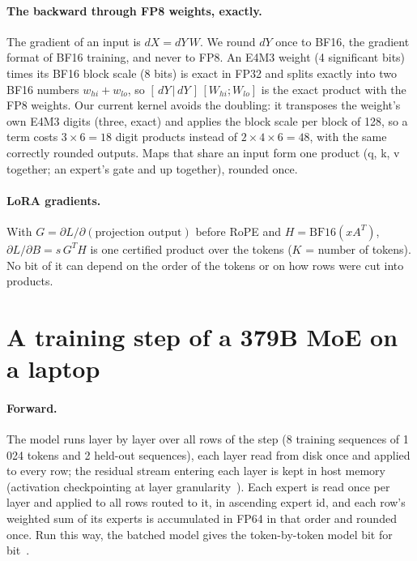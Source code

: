 \documentclass[11pt]{article}
\begin{document}
\paragraph{The backward through FP8 weights, exactly.} The gradient of an input is $dX = dY\,W$. We round $dY$ once to BF16,
the gradient format of BF16 training, and never to FP8. An E4M3 weight (4 significant bits) times its BF16 block scale
(8 bits) is exact in FP32 and splits exactly into two BF16 numbers $w_{hi}+w_{lo}$, so $[\,dY\,|\,dY\,]\,[W_{hi};W_{lo}]$ is the
exact product with the FP8 weights. Our current kernel avoids the doubling: it transposes the weight's own E4M3 digits (three,
exact) and applies the block scale per block of 128, so a term costs $3\times6=18$ digit products instead of
$2\times4\times6=48$, with the same correctly rounded outputs. Maps that share an input form one product (q, k, v together;
an expert's gate and up together), rounded once.

\paragraph{LoRA gradients.} With $G=\partial L/\partial(\text{projection output})$ before RoPE and $H=\text{BF16}(x A^{T})$,
$\partial L/\partial B = s\,G^{T} H$ is one certified product over the tokens ($K$ = number of tokens). No bit of it can depend
on the order of the tokens or on how rows were cut into products.

\section{A training step of a 379B MoE on a laptop}\label{sec:step}

\paragraph{Forward.} The model runs layer by layer over all rows of the step (8 training sequences of 1\,024 tokens and 2
held-out sequences), each layer read from disk once and applied to every row; the residual stream entering each layer is kept
in host memory (activation checkpointing at layer granularity~\cite{chen16}). Each expert is read once per layer and applied to
all rows routed to it, in ascending expert id, and each row's weighted sum of its experts is accumulated in FP64 in that order
and rounded once. Run this way, the batched model gives the token-by-token model bit for bit~\cite{companion}.
\end{document}
